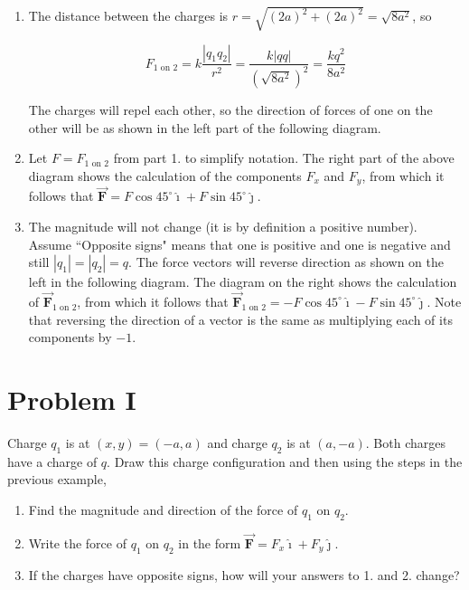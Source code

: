 \documentclass{article}
\renewcommand{\mbox}{\text}
\newcommand{\ihat}[0]{\hat{\boldsymbol{\imath}}}
\newcommand{\jhat}[0]{\hat{\boldsymbol{\jmath}}}
\newcommand{\bfvec}[1]{\vec{\mathbf{#1}}}
\begin{document}
\begin{enumerate}

  \item The distance between the charges is $r=\sqrt{(2a)^2+(2a)^2}=\sqrt{8a^2}$, so

        \begin{equation}
        F_{1\mbox{ on } 2}=k\frac{|q_1q_2|}{r^2}=\frac{k|qq|}{(\sqrt{8a^2})^2}=\frac{kq^2}{8a^2}
        \end{equation}

        The charges will repel each other, so the direction of forces of one on the other will be as shown in the left part of the following diagram.

        

  \item Let $F = F_{1\mbox{ on } 2}$ from part 1. to simplify notation. The right part of the above diagram shows the calculation of the components $F_x$ and $F_y$, from which it follows that $\bfvec{F} = F\cos 45^\circ \ihat + F\sin 45^\circ \jhat$.

  \item The magnitude will not change (it is by definition a positive number). Assume ``Opposite signs" means that one is positive and one is negative and still $|q_1|=|q_2|=q$. The force vectors will reverse direction as shown on the left in the following diagram. The diagram on the right shows the calculation of $\bfvec{F}_{1\mbox{ on } 2}$, from which it follows that $\bfvec{F}_{1\mbox{ on } 2} = -F\cos 45^\circ \ihat - F\sin 45^\circ \jhat$. Note that reversing the direction of a vector is the same as multiplying each of its components by $-1$.

        

\end{enumerate}

\ifsolutions
\clearpage
\fi

\section{Problem I}

Charge $q_1$ is at $(x,y)=(-a,a)$ and charge $q_2$ is at $(a, -a)$. Both charges have a charge of $q$. Draw this charge configuration and then using the steps in the previous example,

\begin{enumerate}

  \item Find the magnitude and direction of the force of $q_1$ on $q_2$.

  \item Write the force of $q_1$ on $q_2$ in the form $\bfvec{F}=F_x\ihat + F_y\jhat$.

  \item If the charges have opposite signs, how will your answers to 1. and 2. change?

\end{enumerate}
\end{document}
